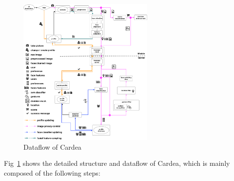 \begin{figure}[!htbp]
    \centering
    \includegraphics[width=0.6\textwidth]{figure/ch4-cardeadataflow.pdf}
    \caption{Dataflow of Cardea}
    \label{fig:ch4-cardeadataflow}
\end{figure}

Fig~\ref{fig:ch4-cardeadataflow} shows the detailed structure and dataflow of Cardea, which is mainly composed of the following steps:

